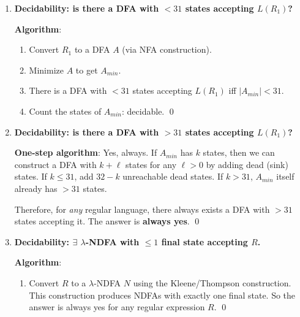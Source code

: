 \begin{enumerate}[{12.}1. ]
\textbf{Algorithm}: $L(R_1)\cap L(R_2)\neq\emptyset$?
\begin{enumerate}
\item Convert $R_1,R_2$ to DFAs $A_1,A_2$.
\item Compute the product DFA $A^\cap$ for $L(A_1)\cap L(A_2)$.
\item Check $L(A^\cap)\neq\emptyset$ (decidable by Theorem 12.1). \qed
\end{enumerate}

\item \textbf{Decidability: is there a DFA with $< 31$ states accepting $L(R_1)$?}

\textbf{Algorithm}:
\begin{enumerate}
\item Convert $R_1$ to a DFA $A$ (via NFA construction).
\item Minimize $A$ to get $A_{min}$.
\item There is a DFA with $<31$ states accepting $L(R_1)$ iff $|A_{min}| < 31$.
\item Count the states of $A_{min}$: decidable. \qed
\end{enumerate}

\item \textbf{Decidability: is there a DFA with $>31$ states accepting $L(R_1)$?}

\textbf{One-step algorithm}: Yes, always. If $A_{min}$ has $k$ states, then we can construct a DFA with $k + \ell$ states for any $\ell > 0$ by adding dead (sink) states. If $k \leq 31$, add $32-k$ unreachable dead states. If $k > 31$, $A_{min}$ itself already has $>31$ states.

Therefore, for \emph{any} regular language, there always exists a DFA with $>31$ states accepting it. The answer is \textbf{always yes}. \qed

\item \textbf{Decidability: $\exists$ $\lambda$-NDFA with $\leq 1$ final state accepting $R$.}

\textbf{Algorithm}:
\begin{enumerate}
\item Convert $R$ to a $\lambda$-NDFA $N$ using the Kleene/Thompson construction. This construction produces NDFAs with exactly one final state. So the answer is always yes for any regular expression $R$. \qed
\end{enumerate}


\end{enumerate}
